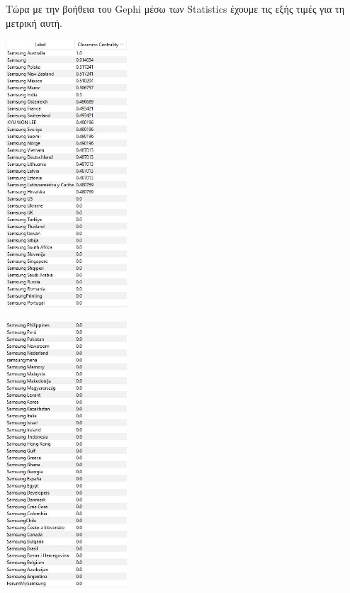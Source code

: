 \documentclass[12pt]{article}
\begin{document}
	\newpage
	Τώρα με την βοήθεια του Gephi μέσω των Statistics έχουμε τις εξής τιμές για τη μετρική αυτή.
	\vspace{12pt}
	\begin{center}
		\begin{adjustbox}{valign=t}
			\includegraphics[width=0.34\textwidth]{photos-files/section7/closeness_centrality1.JPG}
		\end{adjustbox}
		\hfill
		\begin{adjustbox}{valign=t}
			\includegraphics[width=0.34\textwidth]{photos-files/section7/closeness_centrality2.JPG}
		\end{adjustbox}
	\end{center}
	
\end{document}
